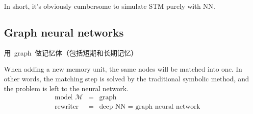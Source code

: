 \documentclass[12pt, orivec]{article}
\begin{document}
In short, it's obviously cumbersome to simulate STM purely with NN.

\subsection{Graph neural networks}
\label{graph-NN}

\begin{tcolorbox}[ams equation, colback=yellow, colframe=white]
\mbox{用 graph 做记忆体（包括短期和长期记忆）}
\end{tcolorbox}
When adding a new memory unit, the same nodes will be matched into one. In other words, the matching step is solved by the traditional symbolic method, and the problem is left to the neural network.\begin{eqnarray}
\mbox{model } \mathcal{M} &=& \mbox{graph} \nonumber \\
\mbox{rewriter} &=& \mbox{deep NN = graph neural network}
\end{eqnarray}
\end{document}
